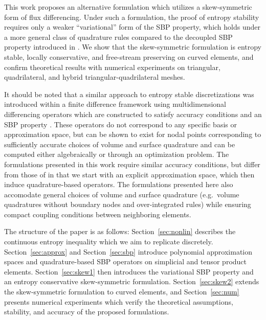 \documentclass{svjour3}                     %
\renewcommand{\note}[1]{{\color{blue}{#1}}}
\begin{document}
This work proposes an alternative formulation which utilizes a skew-symmetric form of flux differencing.  Under such a formulation, the proof of entropy stability requires only a weaker ``variational'' form of the SBP property, which holds under a more general class of quadrature rules compared to the decoupled SBP property introduced in \cite{chan2017discretely, chan2018discretely}.  We show that the skew-symmetric formulation is entropy stable, locally conservative, and free-stream preserving on curved elements, and confirm theoretical results with numerical experiments on triangular, quadrilateral, and hybrid triangular-quadrilateral meshes.  

It should be noted that a similar approach to entropy stable discretizations was introduced within a finite difference framework \cite{chen2017entropy, crean2018entropy} using multidimensional differencing operators which are constructed to satisfy accuracy conditions and an SBP property \cite{hicken2016multidimensional}.  These operators do not correspond to any specific basis or approximation space, but can be shown to exist for nodal points corresponding to sufficiently accurate choices of volume and surface quadrature and can be computed either algebraically or through an optimization problem.  The formulations presented in this work require similar accuracy conditions, but differ from those of \cite{chen2017entropy, crean2018entropy} in that we start with an explicit approximation space, which then induce quadrature-based operators.  The formulations presented here also accomodate general choices of volume and surface quadrature (e.g.\ volume quadratures without boundary nodes and over-integrated rules) while ensuring compact coupling conditions between neighboring elements.  

The structure of the paper is as follows: Section~\ref{sec:nonlin} describes the continuous entropy inequality which we aim to replicate discretely.  Section~\ref{sec:approx} and Section~\ref{sec:sbp} introduce polynomial approximation spaces and quadrature-based SBP operators on simplicial and tensor product elements.  Section~\ref{sec:skew1} then introduces the variational SBP property and an entropy conservative skew-symmetric formulation.  Section~\ref{sec:skew2} extends the skew-symmetric formulation to curved elements, and Section~\ref{sec:num} presents numerical experiments which verify the theoretical assumptions, stability, and accuracy of the proposed formulations.

\end{document}
